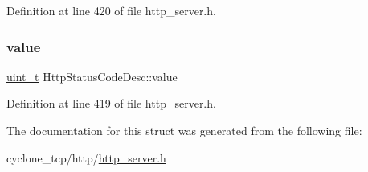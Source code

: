 Definition at line 420 of file http\+\_\+server.\+h.

\mbox{\label{structHttpStatusCodeDesc_adaf71beefc2347ea8482d13dbb9b199b}} 
\subsubsection{\texorpdfstring{value}{value}}
{\footnotesize\ttfamily \hyperlink{compiler__port_8h_a12a1e9b3ce141648783a82445d02b58d}{uint\+\_\+t} Http\+Status\+Code\+Desc\+::value}



Definition at line 419 of file http\+\_\+server.\+h.



The documentation for this struct was generated from the following file\+:\begin{DoxyCompactItemize}
\item 
cyclone\+\_\+tcp/http/\hyperlink{http__server_8h}{http\+\_\+server.\+h}\end{DoxyCompactItemize}
